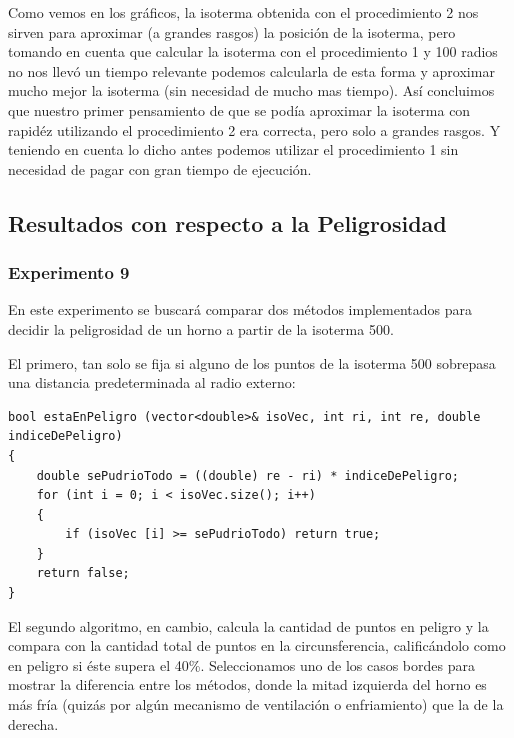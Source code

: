 \par Como vemos en los gráficos, la isoterma obtenida con el procedimiento 2 nos sirven para aproximar (a grandes rasgos) la posición de la isoterma, pero tomando en cuenta que calcular la isoterma con el procedimiento 1 y 100 radios no nos llevó un tiempo relevante podemos calcularla de esta forma y aproximar mucho mejor la isoterma (sin necesidad de mucho mas tiempo). Así concluimos que nuestro primer pensamiento de que se podía aproximar la isoterma con rapidéz utilizando el procedimiento 2 era correcta, pero solo a grandes rasgos. Y teniendo en cuenta lo dicho antes podemos utilizar el procedimiento 1 sin necesidad de pagar con gran tiempo de ejecución.


\subsection{Resultados con respecto a la Peligrosidad}

\subsubsection{Experimento 9}

\par En este experimento se buscará comparar dos métodos implementados para decidir la peligrosidad de un horno a partir de la isoterma 500.
\par El primero, tan solo se fija si alguno de los puntos de la isoterma 500 sobrepasa una distancia predeterminada al radio externo:

\lstset{language=C++, breaklines=true, basicstyle=\footnotesize}
\begin{lstlisting}[frame=single]
bool estaEnPeligro (vector<double>& isoVec, int ri, int re, double indiceDePeligro)
{
    double sePudrioTodo = ((double) re - ri) * indiceDePeligro;
    for (int i = 0; i < isoVec.size(); i++)
    {
        if (isoVec [i] >= sePudrioTodo) return true;
    }
    return false;
}
\end{lstlisting}

\par El segundo algoritmo, en cambio, calcula la cantidad de puntos en peligro y la compara con la cantidad total de puntos en la circunsferencia, calificándolo como en peligro si éste supera el 40\%. Seleccionamos uno de los casos bordes para mostrar la diferencia entre los métodos, donde la mitad izquierda del horno es más fría (quizás por algún mecanismo de ventilación o enfriamiento) que la de la derecha.

